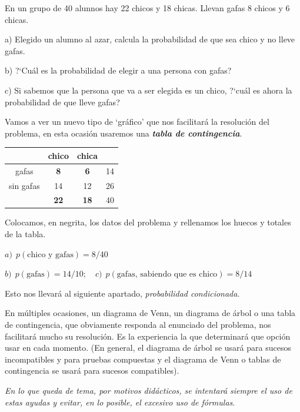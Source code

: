 \begin{ejemplo}
\begin{ejre}
 En un grupo de 40 alunnos hay 22 chicos y 18 chicas. Llevan gafas 8 chicos y 6 chicas. 
 
 a) Elegido un alumno al azar, calcula la probabilidad de que sea chico y no lleve gafas.
 
 b) ?`Cuál es la probabilidad de elegir a una persona con gafas? 
 
c)  Si sabemos que la persona que va a ser elegida es un chico, ?`cuál es ahora la probabilidad de que lleve gafas?
\end{ejre}

\vspace{4mm} Vamos a ver un nuevo tipo de `gráfico' que nos facilitará la resolución del problema, en esta ocasión usaremos una \textbf{\emph{tabla de contingencia}}.

\begin{multicols}{2}
\begin{table}[H]
\centering
\begin{tabular}{c|c|c|c}
 & chico & chica &  \\ \hline
gafas & \textbf{8} & \textbf{6} & 14 \\ \hline
sin gafas & 14 & 12 & 26 \\ \hline
 & \textbf{22} & \textbf{18} & 40
\end{tabular}
\end{table}
Colocamos, en negrita, los datos del problema y rellenamos los huecos y totales de la tabla.

$a)\ \ p(\text{chico y gafas})=8/40$
\end{multicols}

$b)\ \ p(\text{gafas})=14/10; \quad c)\ \ p(\text{gafas, sabiendo que es chico})=8/14$

Esto nos llevará al siguiente apartado, \emph{probabilidad condicionada}.
	
\end{ejemplo}

\begin{destacado}
	En múltiples ocasiones, un diagrama de Venn, un diagrama de árbol o una tabla de contingencia, que obviamente responda al enunciado del problema, nos facilitará mucho su resolución. Es la experiencia la que determinará que opción usar en cada momento. (En general, el diagrama de árbol se usará para sucesos incompatibles y para pruebas compuestas y el diagrama de Venn o tablas de contingencia se usará para sucesos compatibles).
	
	\emph{En lo que queda de tema, por motivos didácticos, se intentará siempre el uso de estas ayudas y evitar, en lo posible, el excesivo uso de fórmulas}.
\end{destacado}

